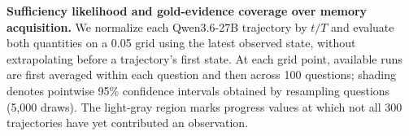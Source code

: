 \textbf{Sufficiency likelihood and gold-evidence coverage over memory acquisition.}
We normalize each Qwen3.6-27B trajectory by $t/T$ and evaluate both quantities on a 0.05 grid using the latest observed state, without extrapolating before a trajectory's first state.
At each grid point, available runs are first averaged within each question and then across 100 questions; shading denotes pointwise 95\% confidence intervals obtained by resampling questions (5,000 draws).
The light-gray region marks progress values at which not all 300 trajectories have yet contributed an observation.
